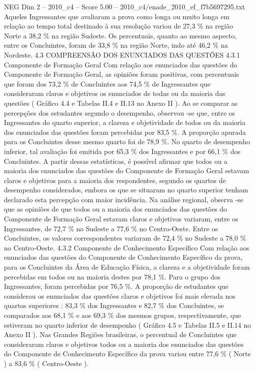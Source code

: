 \begin{textsample}{NEG Dim 2 – 2010\_c4 – Score 5.00 – 2010\_c4/enade\_2010\_ef\_f7b5697295.txt}
Aqueles Ingressantes que avaliaram a prova como longa ou muito longa em relação ao tempo total destinado à sua resolução variou de 27,3 \% na região Norte a 38,2 \% na região Sudeste.
Os percentuais, quanto ao mesmo aspecto, entre os Concluintes, foram de 33,8 \% na região Norte, indo até 46,2 \% na Nordeste. 4.3 COMPREENSÃO DOS ENUNCIADOS DAS QUESTÕES 4.3.1 Componente de Formação Geral Com relação aos enunciados das questões do Componente de Formação Geral, as opiniões foram positivas, com percentuais que foram dos 73,2 \% de Concluintes aos 74,5 \% de Ingressantes que consideraram claros e objetivos os enunciados de todas ou da maioria das questões ( Gráfico 4.4 e Tabelas II.4 e II.13 no Anexo II ).
Ao se comparar as percepções dos estudantes segundo o desempenho, observou -se que, entre os Ingressantes do quarto superior, a clareza e objetividade de todos ou da maioria dos enunciados das questões foram percebidas por 83,5 \%.
A proporção apurada para os Concluintes desse mesmo quarto foi de 78,9 \%.
No quarto de desempenho inferior, tal avaliação foi emitida por 65,3 \% dos Ingressantes e por 66,1 \% dos Concluintes.
A partir dessas estatísticas, é possível afirmar que todos ou a maioria dos enunciados das questões do Componente de Formação Geral estavam claros e objetivos para a maioria dos respondentes, segundo os quartos de desempenho considerados, embora os que se situaram no quarto superior tenham declarado esta percepção com maior incidência.
Na análise regional, observa -se que as opiniões de que todos ou a maioria dos enunciados das questões do Componente de Formação Geral estavam claros e objetivos variaram, entre os Ingressantes, de 72,7 \% no Sudeste a 77,6 \% no Centro-Oeste.
Entre os Concluintes, os valores correspondentes variaram de 72,4 \% no Sudeste a 78,0 \% no Centro-Oeste. 4.3.2 Componente de Conhecimento Específico Com relação aos enunciados das questões do Componente de Conhecimento Específico da prova, para os Concluintes da Área de Educação Física, a clareza e a objetividade foram percebidas em todos ou na maioria destes por 78,1 \%.
Para o grupo dos Ingressantes, foram percebidas por 76,5 \%.
A proporção de estudantes que considerou os enunciados das questões claros e objetivos foi mais elevada nos quartos superiores : 83,3 \% dos Ingressantes e 82,7 \% dos Concluintes, se comparados aos 68,1 \% e aos 69,3 \% dos mesmos grupos, respectivamente, que estiveram no quarto inferior de desempenho ( Gráfico 4.5 e Tabelas II.5 e II.14 no Anexo II ).
Nas Grandes Regiões brasileiras, o percentual de Concluintes que consideraram claros e objetivos todos ou a maioria dos enunciados das questões do Componente de Conhecimento Específico da prova variou entre 77,6 \% ( Norte ) a 83,6 \% ( Centro-Oeste ).

\end{textsample}
